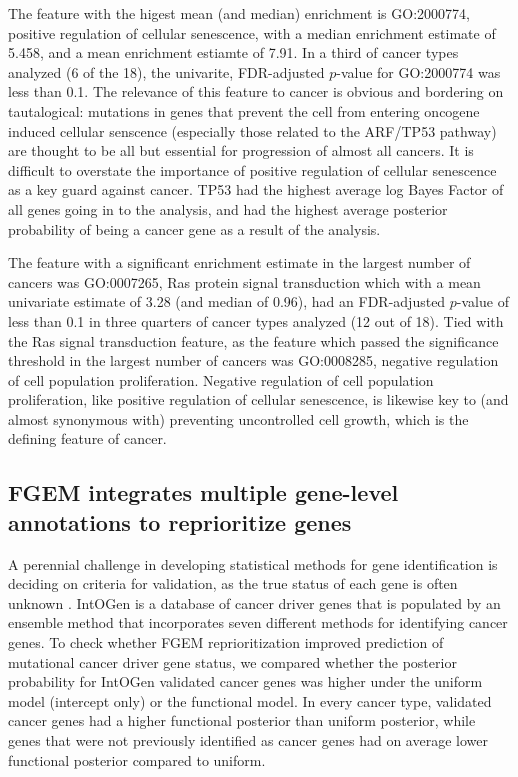 The feature with the higest mean (and median) enrichment is GO:2000774, positive regulation of cellular senescence, with a median enrichment estimate of 5.458, and a mean enrichment estiamte of 7.91.  In a third of cancer types analyzed (6 of the 18), the univarite, FDR-adjusted $p$-value for GO:2000774 was less than 0.1.  The relevance of this feature to cancer is obvious and bordering on tautalogical: mutations in genes that prevent the cell from entering oncogene induced cellular senscence (especially those related to the ARF/TP53 pathway)  are thought to be all but essential for progression of almost all cancers\cite{chandeck10_oncog_induc_cellul_senes}.  It is difficult to overstate the importance of positive regulation of cellular senescence as a key guard against cancer.  TP53 had the highest average log Bayes Factor of all genes going in to the analysis, and had the highest average posterior probability of being a cancer gene as a result of the analysis.



The feature with a significant enrichment estimate in the largest number of cancers was GO:0007265, Ras protein signal transduction which with a mean univariate estimate of 3.28 (and median of 0.96), had an FDR-adjusted $p$-value of less than 0.1 in three quarters of cancer types analyzed (12 out of 18).  Tied with the Ras signal transduction feature, as the feature which passed the significance threshold in the largest number of cancers was GO:0008285, negative regulation of cell population proliferation.  Negative regulation of cell population proliferation, like positive regulation of cellular senescence, is likewise key to (and almost synonymous with) preventing uncontrolled cell growth, which is the defining feature of cancer.





\subsection{FGEM integrates multiple gene-level annotations to reprioritize genes}\label{sec:orgf0225be}

A perennial challenge in developing statistical methods for gene identification is deciding on criteria for validation, as the true status of each gene is often unknown\cite{Schaid_2018} \cite{drivermaps}.  IntOGen is a database of cancer driver genes that is populated by an ensemble method that incorporates seven different methods for identifying cancer genes. To check whether FGEM reprioritization improved prediction of mutational cancer driver gene status, we compared whether the posterior probability for IntOGen validated cancer genes was higher under the uniform model (intercept only) or the functional model. In every cancer type, validated cancer genes had a higher functional posterior than uniform posterior, while genes that were not previously identified as cancer genes had on average lower functional posterior compared to uniform.


